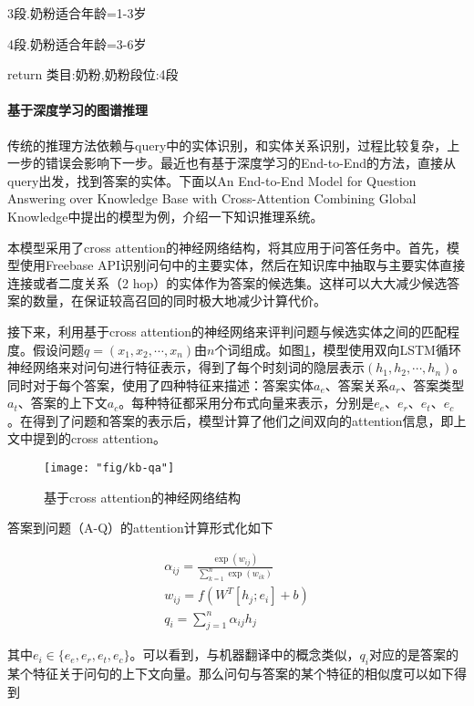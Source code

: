 3段.奶粉适合年龄=1-3岁

4段.奶粉适合年龄=3-6岁

return 类目:奶粉,奶粉段位:4段

\paragraph{基于深度学习的图谱推理}

传统的推理方法依赖与query中的实体识别，和实体关系识别，过程比较复杂，上一步的错误会影响下一步。最近也有基于深度学习的End-to-End的方法，直接从query出发，找到答案的实体。下面以An End-to-End Model for Question Answering over Knowledge Base with Cross-Attention Combining Global Knowledge\cite{1}中提出的模型为例，介绍一下知识推理系统。

本模型采用了cross attention的神经网络结构，将其应用于问答任务中。首先，模型使用Freebase API识别问句中的主要实体，然后在知识库中抽取与主要实体直接连接或者二度关系（2 hop）的实体作为答案的候选集。这样可以大大减少候选答案的数量，在保证较高召回的同时极大地减少计算代价。

接下来，利用基于cross attention的神经网络来评判问题与候选实体之间的匹配程度。假设问题$q=(x_1, x_2, \cdots, x_n)$由$n$个词组成。如图\ref{fig:kb-qa}，模型使用双向LSTM循环神经网络来对问句进行特征表示，得到了每个时刻词的隐层表示$(h_1, h_2, \cdots, h_n)$。同时对于每个答案，使用了四种特征来描述：答案实体$a_e$、答案关系$a_r$、答案类型$a_t$、答案的上下文$a_c$。每种特征都采用分布式向量来表示，分别是$e_e$、$e_r$、$e_t$、$e_c$。在得到了问题和答案的表示后，模型计算了他们之间双向的attention信息，即上文中提到的cross attention。

\begin{figure}[ht]
	\centering
	\texttt{[image: "fig/kb-qa"]}
	\caption{基于cross attention的神经网络结构}
	\label{fig:kb-qa}
\end{figure}

答案到问题（A-Q）的attention计算形式化如下

\begin{gather}
	\alpha_{ij}=\frac{\exp(w_{ij})}{\sum_{k=1}^{n}\exp(w_{ik})} \\
	w_{ij}=f(W^T[h_j;e_i]+b)\\
	q_i=\sum_{j=1}^{n}\alpha_{ij}h_j
\end{gather}

其中$e_i\in\{e_e, e_r, e_t, e_c\}$。可以看到，与机器翻译中的概念类似，$q_i$对应的是答案的某个特征关于问句的上下文向量。那么问句与答案的某个特征的相似度可以如下得到

